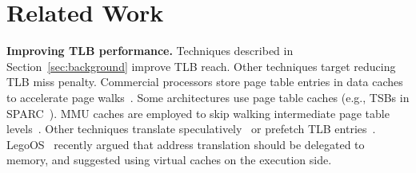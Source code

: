 \section{Related Work}
\label{sec:relatedwork}








\noindent\textbf{Improving TLB performance.} Techniques described in Section~\ref{sec:background} improve TLB reach. Other techniques target reducing TLB miss penalty. Commercial processors store page table entries in data caches to accelerate page walks~\cite{intel:architectures}. Some architectures use page table caches (e.g., TSBs in SPARC~\cite{sun:ultrasparc}). MMU caches are employed to skip walking intermediate page table levels~\cite{bhattacharjee:large-reach, barr:translation}. Other techniques translate speculatively~\cite{barr:spectlb} or prefetch TLB entries~\cite{bhattacharjee:characterizing}. LegoOS~\cite{shan:legoos} recently argued that address translation should be delegated to memory, and suggested using virtual caches on the execution side.

